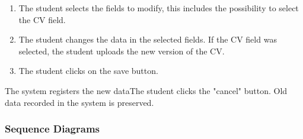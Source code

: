 \begin{use-case}
{\begin{enumerate}
                  \item The student selects the fields to modify, this includes the possibility to select the CV field.
                  \item The student changes the data in the selected fields. If the CV field was selected, the student uploads the new version of the CV.
                  \item The student clicks on the save button.
              \end{enumerate}  
            }{The system registers the new data}{The student clicks the "cancel" button. Old data recorded in the system is preserved.}
\end{use-case}
\subsubsection{Sequence Diagrams}
